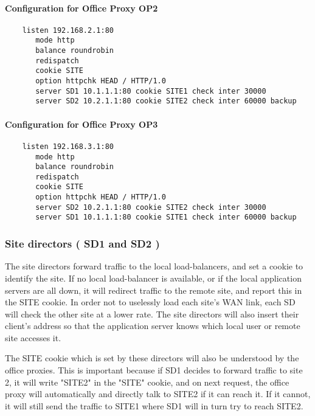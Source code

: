 \paragraph{Configuration for Office Proxy OP2}

\begin{verbatim}
    listen 192.168.2.1:80
       mode http
       balance roundrobin
       redispatch
       cookie SITE
       option httpchk HEAD / HTTP/1.0
       server SD1 10.1.1.1:80 cookie SITE1 check inter 30000
       server SD2 10.2.1.1:80 cookie SITE2 check inter 60000 backup
\end{verbatim}

\paragraph{Configuration for Office Proxy OP3}

\begin{verbatim}
    listen 192.168.3.1:80
       mode http
       balance roundrobin
       redispatch
       cookie SITE
       option httpchk HEAD / HTTP/1.0
       server SD2 10.2.1.1:80 cookie SITE2 check inter 30000
       server SD1 10.1.1.1:80 cookie SITE1 check inter 60000 backup
\end{verbatim}

\subsubsection{Site directors ( SD1 and SD2 )}

The site directors forward traffic to the local load-balancers, and set a
cookie to identify the site. If no local load-balancer is available, or if
the local application servers are all down, it will redirect traffic to the
remote site, and report this in the SITE cookie. In order not to uselessly
load each site's WAN link, each SD will check the other site at a lower
rate. The site directors will also insert their client's address so that
the application server knows which local user or remote site accesses it.

The SITE cookie which is set by these directors will also be understood
by the office proxies. This is important because if SD1 decides to forward
traffic to site 2, it will write "SITE2" in the "SITE" cookie, and on next
request, the office proxy will automatically and directly talk to SITE2 if
it can reach it. If it cannot, it will still send the traffic to SITE1
where SD1 will in turn try to reach SITE2.

